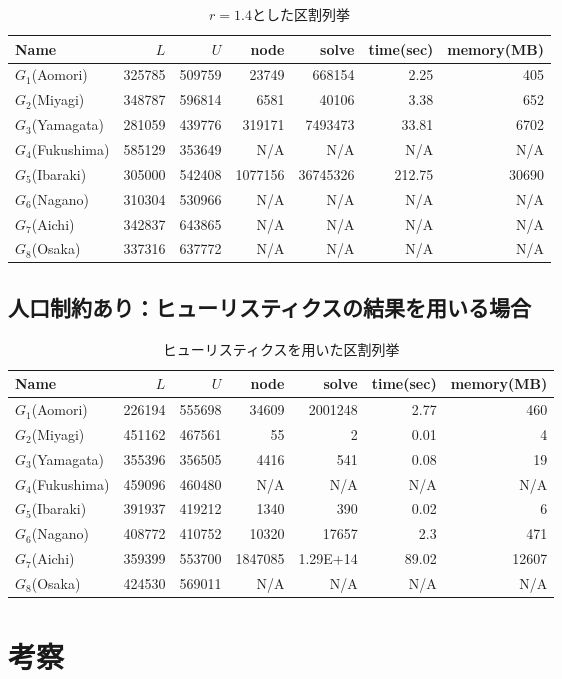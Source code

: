 \begin{table}[htbp]
  \caption{$r=1.4$とした区割列挙}
  \label{out_r}
  \centering
  \begin{tabular}{l||r|r||r|r|r|r}
    \hline
    Name & $L$ & $U$ & node & solve & time(sec) & memory(MB) \\
    \hline \hline
    $G_1$(Aomori) & 325785 & 509759 & 23749 & 668154 & 2.25 & 405 \\
    $G_2$(Miyagi) & 348787 & 596814 & 6581 & 40106 & 3.38 & 652 \\
    $G_3$(Yamagata) & 281059 & 439776 & 319171 & 7493473 & 33.81 & 6702 \\
    $G_4$(Fukushima) & 585129 & 353649 & N/A & N/A & N/A & N/A \\
    $G_5$(Ibaraki) & 305000 & 542408 & 1077156 & 36745326 & 212.75 & 30690 \\
    $G_6$(Nagano) & 310304 & 530966 & N/A & N/A & N/A & N/A \\
    $G_7$(Aichi) & 342837 & 643865 & N/A & N/A & N/A & N/A \\
    $G_8$(Osaka) & 337316 & 637772 & N/A & N/A & N/A & N/A \\
    \hline
  \end{tabular}
\end{table}


\subsection{人口制約あり：ヒューリスティクスの結果を用いる場合}

\begin{table}[htbp]
  \caption{ヒューリスティクスを用いた区割列挙}
  \label{out_h}
  \centering
  \begin{tabular}{l||r|r||r|r|r|r}
    \hline
    Name & $L$ & $U$ & node & solve & time(sec) & memory(MB) \\
    \hline \hline
    $G_1$(Aomori) & 226194 & 555698 & 34609 & 2001248 & 2.77 & 460 \\
    $G_2$(Miyagi) & 451162 & 467561 & 55 & 2 & 0.01 & 4 \\
    $G_3$(Yamagata) & 355396 & 356505 & 4416 & 541 & 0.08 & 19 \\
    $G_4$(Fukushima) & 459096 & 460480 & N/A & N/A & N/A & N/A \\
    $G_5$(Ibaraki) & 391937 & 419212 & 1340 & 390 & 0.02 & 6 \\
    $G_6$(Nagano) & 408772 & 410752 & 10320 & 17657 & 2.3 & 471 \\
    $G_7$(Aichi) & 359399 & 553700 & 1847085 & 1.29E+14 & 89.02 & 12607 \\
    $G_8$(Osaka) & 424530 & 569011 & N/A & N/A & N/A & N/A \\
    \hline
  \end{tabular}
\end{table}


\section{考察}